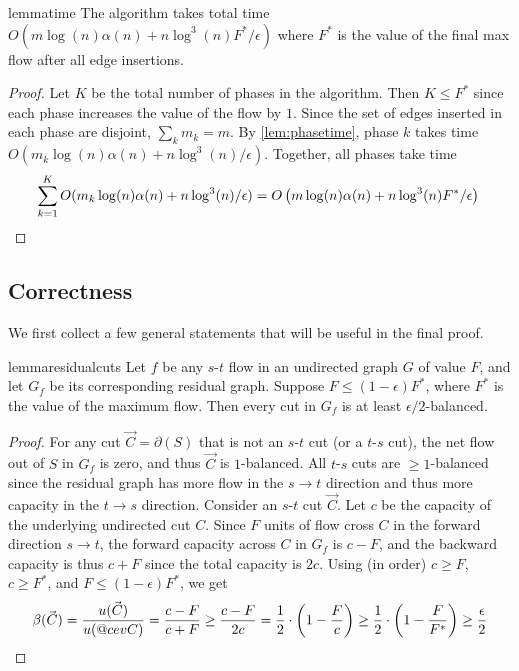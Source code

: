 \documentclass[11pt,a4paper]{article}
\makeatletter
\newcommand{\eps}{\epsilon}
\DeclareRobustCommand{\cev}[1]{{\mathpalette\do@cev{#1}}}
\newcommand{\do@cev}[2]{\vbox{\offinterlineskip
    \sbox\z@{$\m@th#1 x$}\ialign{##\cr
      \hidewidth\reflectbox{$\m@th#1\vec{}\mkern4mu$}\hidewidth\cr
      \noalign{\kern-\ht\z@}
      $\m@th#1#2$\cr
    }}}
\makeatother
\begin{document}
\begin{restatable}{lemma}{time}
\label{lem:time}
The algorithm takes total time $O(m \log (n) \alpha(n) + n \log^3 (n) F^*/\eps)$ where $F^*$ is the value of the final max flow after all edge insertions.
\end{restatable}
\begin{proof}
Let $K$ be the total number of phases in the algorithm. Then $K \le F^*$ since each phase increases the value of the flow by $1$.
Since the set of edges inserted in each phase are disjoint, $\sum_k m_k = m$.
By \cref{lem:phasetime}, phase $k$ takes time $O(m_k \log (n) \alpha(n) + n \log^3 (n)/\eps)$. Together, all phases take time
\[
\sum_{k = 1}^{K} O(m_k \log(n) \alpha(n) + n\log^3(n)/\eps) = O\left(m \log (n) \alpha(n) + n \log^3 (n) F^*/\eps\right) \qedhere
\]
\end{proof}

\subsection{Correctness}
\label{sec:correctness}

We first collect a few general statements that will be useful in the final proof.

\begin{restatable}{lemma}{residualcuts}
\label{lem:residualcuts}
Let $f$ be any $s$-$t$ flow in an undirected graph $G$ of value $F$, and let $G_f$ be its corresponding residual graph. Suppose $F \le (1-\eps) F^*$, where $F^*$ is the value of the maximum flow. Then every cut in $G_f$ is at least $\eps/2$-balanced.
\end{restatable}
\begin{proof}
For any cut $\vec{C} = \partial(S)$ that is not an $s$-$t$ cut (or a $t$-$s$ cut), the net flow out of $S$ in $G_f$ is zero, and thus $\vec{C}$ is $1$-balanced. All $t$-$s$ cuts are $\ge 1$-balanced since the residual graph has more flow in the $s \to t$ direction and thus more capacity in the $t \to s$ direction.
Consider an $s$-$t$ cut $\vec{C}$. Let $c$ be the capacity of the underlying undirected cut $C$. Since $F$ units of flow cross $C$ in the forward direction $s \to t$, the forward capacity across $C$ in $G_f$ is $c - F$, and the backward capacity is thus $c + F$ since the total capacity is $2c$. Using (in order) $c \ge F$, $c \ge F^*$, and $F \le  (1-\eps) F^*$, we get
\[
\beta(\vec{C})
= \frac{u(\vec{C})}{u(\cev{C})}
= \frac{c-F}{c+F}
\ge \frac{c-F}{2c}
= \frac{1}{2} \cdot \left( 1 - \frac{F}{c} \right)
\ge \frac{1}{2} \cdot \left( 1 - \frac{F}{F^*} \right)
\ge \frac{\eps}{2}
\qedhere
\]
\end{proof}
\end{document}

